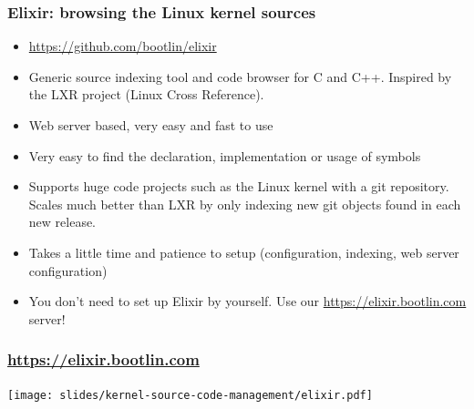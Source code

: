 \begin{frame}
  \frametitle{Elixir: browsing the Linux kernel sources}
  \begin{itemize}
  \item \url{https://github.com/bootlin/elixir}
  \item Generic source indexing tool and code browser for C and C++.
        Inspired by the LXR project (Linux Cross Reference).
  \item Web server based, very easy and fast to use
  \item Very easy to find the declaration, implementation or usage
    of symbols
  \item Supports huge code projects such as the Linux kernel with
     a git repository. Scales much better than LXR  by only indexing
     new git objects found in each new release.
  \item Takes a little time and patience to setup (configuration,
    indexing, web server configuration)
  \item You don't need to set up Elixir by yourself. Use our
    \url{https://elixir.bootlin.com} server!
  \end{itemize}
\end{frame}

\begin{frame}
  \frametitle{\url{https://elixir.bootlin.com}}
  \begin{center}
    \texttt{[image: slides/kernel-source-code-management/elixir.pdf]}
  \end{center}
\end{frame}

